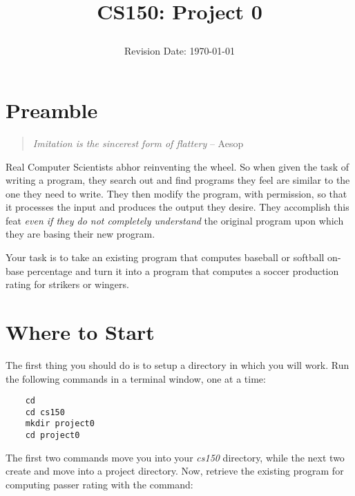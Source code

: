 \documentclass[12pt]{article}
\title{CS150: Project 0\\
\date{Revision Date: \today}}
\begin{document}
\maketitle

\thispagestyle{empty}

\W\subsubsection*{}
\W\htmlrule


\section*{Preamble}

\begin{quote}
{\it Imitation is the sincerest form of flattery}
-- Aesop
\end{quote}

Real Computer Scientists abhor reinventing the wheel. 
So when given the task of writing a program, they search out and find programs
they feel are similar to the one they need to write.
They then modify the program, with permission,
so that it processes the input and
produces the output
they desire.
They accomplish this feat {\it even if they do not completely understand}
the original program upon which they are basing their new program.

Your task is to take an existing program that computes
baseball or softball on-base percentage 
and turn it into a program that computes
a soccer production rating for strikers or wingers.

\section*{Where to Start}

The first thing you should do is to setup a directory in which you will work.
Run the following commands in a terminal window, one at a time:

\begin{verbatim}
    cd
    cd cs150
    mkdir project0
    cd project0
\end{verbatim}

The first two commands move you into your {\it cs150} directory, while the next
two create and move into a project directory.
Now, 
retrieve the existing program for computing passer rating
with the command:
\end{document}
